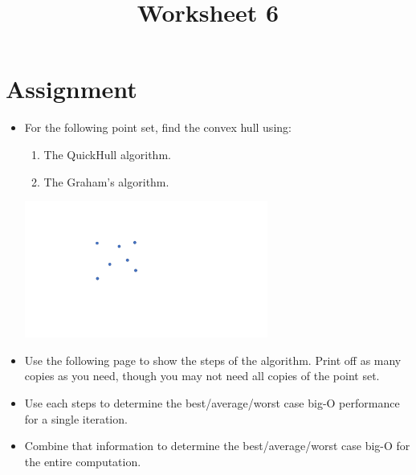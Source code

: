 \documentclass[a4paper,12pt]{article}
\title{Worksheet 6}
\begin{document}
\maketitle

\worksheetGroundRules


\vspace{5pt}
\section{Assignment}

\begin{itemize}


\item For the following point set, find the convex hull using:

\begin{enumerate}
	\item The QuickHull algorithm. 
	\item The Graham's algorithm. 
\end{enumerate}

\vspace{-10pt}
\begin{center}
\includegraphics[width=8cm]{../images/chull.pdf}
\end{center}

\vspace{-10pt}
\item Use the following page to show the steps of the algorithm. Print off as many copies as you need, though you may not need all copies of the point set. 

\item Use each steps to determine the best/average/worst case big-O performance for a single iteration. 
\item Combine that information to determine the best/average/worst case big-O for the entire computation.



\end{itemize}


\worksheetSubmission
\end{document}
